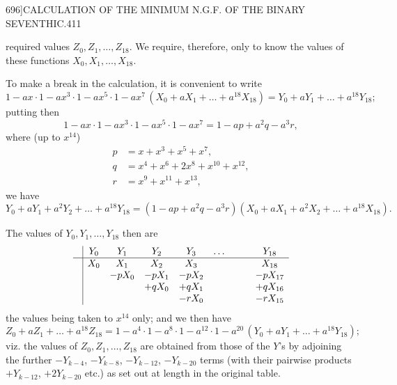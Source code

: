 \documentclass[11pt]{article}
\begin{document}
\clearpage
\begin{center}\small 696]\hfill CALCULATION OF THE MINIMUM N.G.F. OF THE BINARY SEVENTHIC.\hfill 411\end{center}

required values $Z_{0}, Z_{1}, \dots, Z_{18}$. We require, therefore, only to know the values of these functions $X_{0}, X_{1}, \dots, X_{18}$.

To make a break in the calculation, it is convenient to write
\[ 1 - ax\cdot 1 - ax^{3}\cdot 1 - ax^{5}\cdot 1 - ax^{7}\,(X_{0} + a X_{1} + \dots + a^{18} X_{18}) = Y_{0} + a Y_{1} + \dots + a^{18} Y_{18}; \]
putting then
\[ 1 - ax\cdot 1 - ax^{3}\cdot 1 - ax^{5}\cdot 1 - ax^{7} = 1 - ap + a^{2} q - a^{3} r, \]
where (up to $x^{14}$)
\begin{align*}
p &= x + x^{3} + x^{5} + x^{7},\\
q &= x^{4} + x^{6} + 2x^{8} + x^{10} + x^{12},\\
r &= x^{9} + x^{11} + x^{13},
\end{align*}
we have
\[ Y_{0} + a Y_{1} + a^{2} Y_{2} + \dots + a^{18} Y_{18} = (1 - ap + a^{2} q - a^{3} r)(X_{0} + a X_{1} + a^{2} X_{2} + \dots + a^{18} X_{18}). \]

The values of $Y_{0}, Y_{1}, \dots, Y_{18}$ then are
\[
\begin{array}{c|cccccccc}
 & Y_{0} & Y_{1} & Y_{2} & Y_{3} & \dots & & & Y_{18}\\\hline
 & X_{0} & X_{1} & X_{2} & X_{3} & & & & X_{18}\\
 & & -pX_{0} & -pX_{1} & -pX_{2} & & & & -pX_{17}\\
 & & & +qX_{0} & +qX_{1} & & & & +qX_{16}\\
 & & & & -rX_{0} & & & & -rX_{15}\\
\end{array}
\]
the values being taken to $x^{14}$ only; and we then have
\[ Z_{0} + a Z_{1} + \dots + a^{18} Z_{18} = 1 - a^{4}\cdot 1 - a^{8}\cdot 1 - a^{12}\cdot 1 - a^{20}\,(Y_{0} + a Y_{1} + \dots + a^{18} Y_{18}); \]
viz. the values of $Z_{0}, Z_{1}, \dots, Z_{18}$ are obtained from those of the $Y$'s by adjoining the further $-Y_{k-4}$, $-Y_{k-8}$, $-Y_{k-12}$, $-Y_{k-20}$ terms (with their pairwise products $+Y_{k-12}$, $+2Y_{k-20}$ etc.) as set out at length in the original table.
\end{document}
